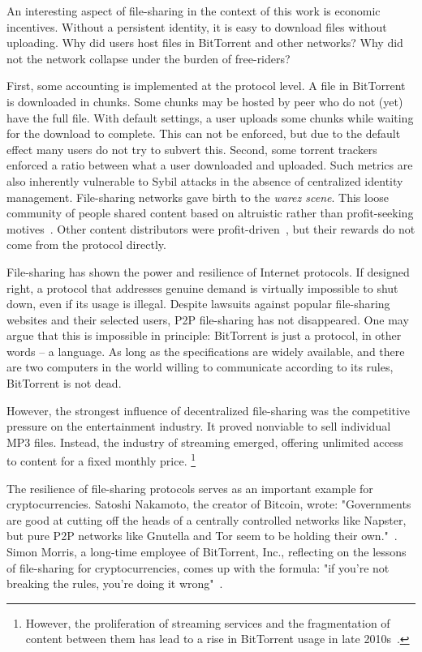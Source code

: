 An interesting aspect of file-sharing in the context of this work is economic incentives.
Without a persistent identity, it is easy to download files without uploading.
Why did users host files in BitTorrent and other networks?
Why did not the network collapse under the burden of free-riders?

First, some accounting is implemented at the protocol level.
A file in BitTorrent is downloaded in chunks.
Some chunks may be hosted by peer who do not (yet) have the full file.
With default settings, a user uploads some chunks while waiting for the download to complete.
This can not be enforced, but due to the default effect many users do not try to subvert this.
Second, some torrent trackers enforced a ratio between what a user downloaded and uploaded.
Such metrics are also inherently vulnerable to Sybil attacks in the absence of centralized identity management.
File-sharing networks gave birth to the \textit{warez scene}.
This loose community of people shared content based on altruistic rather than profit-seeking motives~\cite{Rehn2004}.
Other content distributors were profit-driven~\cite{Rumin2010}, but their rewards do not come from the protocol directly.

File-sharing has shown the power and resilience of Internet protocols.
If designed right, a protocol that addresses genuine demand is virtually impossible to shut down, even if its usage is illegal.
Despite lawsuits against popular file-sharing websites and their selected users, P2P file-sharing has not disappeared.
One may argue that this is impossible in principle: BitTorrent is just a protocol, in other words -- a language.
As long as the specifications are widely available, and there are two computers in the world willing to communicate according to its rules, BitTorrent is not dead.

However, the strongest influence of decentralized file-sharing was the competitive pressure on the entertainment industry.
It proved nonviable to sell individual MP3 files.
Instead, the industry of streaming emerged, offering unlimited access to content for a fixed monthly price.
\footnote{However, the proliferation of streaming services and the fragmentation of content between them has lead to a rise in BitTorrent usage in late 2010s~\cite{Bode2018}.}

The resilience of file-sharing protocols serves as an important example for cryptocurrencies.
Satoshi Nakamoto, the creator of Bitcoin, wrote: "Governments are good at cutting off the heads of a centrally controlled networks like Napster, but pure P2P networks like Gnutella and Tor seem to be holding their own."~\cite{Nakamoto2008}.
Simon Morris, a long-time employee of BitTorrent, Inc., reflecting on the lessons of file-sharing for cryptocurrencies, comes up with the formula: "if you're not breaking the rules, you're doing it wrong"~\cite{Morris2018}.

